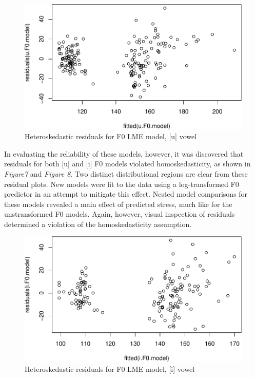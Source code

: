 \documentclass[english,man]{apa6}
\theoremstyle{definition}
\theoremstyle{definition}
\theoremstyle{definition}
\theoremstyle{remark}
\begin{document}
\begin{figure}
\centering
\includegraphics{lithuanian_article_files/figure-latex/Figure7-1.pdf}
\caption{\label{fig:Figure7}Heteroskedastic residuals for F0 LME model,
{[}u{]} vowel}
\end{figure}

In evaluating the reliability of these models, however, it was
discovered that residuals for both {[}u{]} and {[}i{]} F0 models
violated homoskedasticity, as shown in \textit{Figure7} and
\textit{Figure 8}. Two distinct distributional regions are clear from
these residual plots. New models were fit to the data using a
log-transformed F0 predictor in an attempt to mitigate this effect.
Nested model comparisons for these models revealed a main effect of
predicted stress, much like for the unstransformed F0 models. Again,
however, visual inspection of residuals determined a violation of the
homoskedasticity assumption.

\begin{figure}
\centering
\includegraphics{lithuanian_article_files/figure-latex/Figure8-1.pdf}
\caption{\label{fig:Figure8}Heteroskedastic residuals for F0 LME model,
{[}i{]} vowel}
\end{figure}
\end{document}
